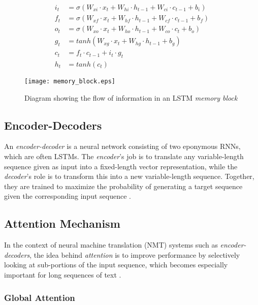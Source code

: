\begin{equation}
\begin{aligned}
i_t &= \sigma(W_{xi} \cdot x_t + W_{hi} \cdot h_{t-1} + W_{ci} \cdot c_{t-1} + b_i) \\
f_t &= \sigma(W_{xf} \cdot x_t + W_{hf} \cdot h_{t-1} + W_{cf} \cdot c_{t-1} + b_f) \\
o_t &= \sigma(W_{xo} \cdot x_t + W_{ho} \cdot h_{t-1} + W_{co} \cdot c_t + b_o) \\
g_t &= tanh(W_{xg} \cdot x_t + W_{hg} \cdot h_{t-1} + b_g) \\
c_t &= f_t \cdot c_{t-1} + i_t \cdot g_t \\
h_t &= tanh(c_t)
\end{aligned}
\end{equation}

\begin{figure}[H]
\centering
\texttt{[image: memory\_block.eps]}
\caption{\cite{graves_hybrid_2013} Diagram showing the flow of information in an LSTM \textit{memory block}}
\label{fig:memory_block}
\end{figure}

\subsection{Encoder-Decoders}

An \textit{encoder-decoder} is a neural network consisting of two eponymous RNNs, which are often LSTMs. The \textit{encoder}'s job is to translate any variable-length sequence given as input into a fixed-length vector representation, while the \textit{decoder}'s role is to transform this into a new variable-length sequence. Together, they are trained to maximize the probability of generating a target sequence given the corresponding input sequence \cite{cho_learning_2014}.

\subsection{Attention Mechanism}

In the context of neural machine translation (NMT) systems such as \textit{encoder-decoders}, the idea behind \textit{attention} is to improve performance by selectively looking at sub-portions of the input sequence, which becomes especially important for long sequences of text \cite{yao_dual_2018}.

\subsubsection*{Global Attention}

